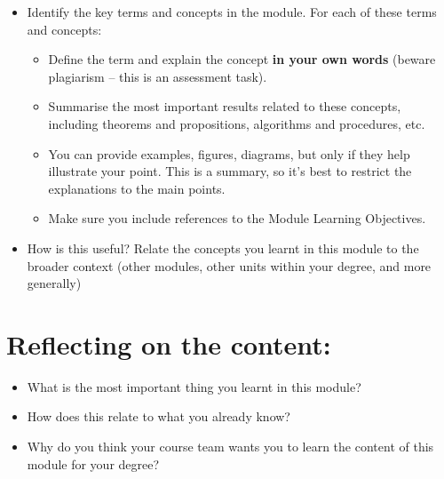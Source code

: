 \documentclass[
  12pt,
  a4paper,
]{scrartcl}
\providecommand{\tightlist}{%
  \setlength{\itemsep}{0pt}\setlength{\parskip}{0pt}}
\begin{document}
\begin{itemize}
\tightlist
\item
  Identify the key terms and concepts in the module. For each of these
  terms and concepts:

  \begin{itemize}
  \tightlist
  \item
    Define the term and explain the concept \textbf{in your own words}
    (beware plagiarism -- this is an assessment task).
  \item
    Summarise the most important results related to these concepts,
    including theorems and propositions, algorithms and procedures, etc.
  \item
    You can provide examples, figures, diagrams, but only if they help
    illustrate your point. This is a summary, so it's best to restrict
    the explanations to the main points.
  \item
    Make sure you include references to the Module Learning Objectives.
  \end{itemize}
\item
  How is this useful? Relate the concepts you learnt in this module to
  the broader context (other modules, other units within your degree,
  and more generally)
\end{itemize}

\section{Reflecting on the content:}\label{reflecting-on-the-content}

\begin{itemize}
\tightlist
\item
  What is the most important thing you learnt in this module?
\item
  How does this relate to what you already know?
\item
  Why do you think your course team wants you to learn the content of
  this module for your degree?
\end{itemize}
\end{document}
